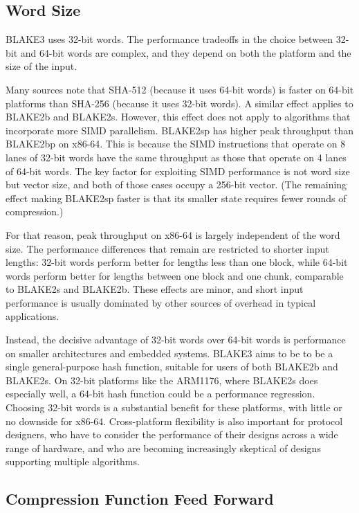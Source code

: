 \documentclass[11pt,notitlepage,a4paper]{article}
\begin{document}
\subsection{Word Size}\label{sec:wordsize}

BLAKE3 uses 32-bit words. The performance tradeoffs in the choice between
32-bit and 64-bit words are complex, and they depend on both the platform and
the size of the input.

Many sources note that SHA-512 (because it uses 64-bit words) is faster on
64-bit platforms than SHA-256 (because it uses 32-bit words). A similar effect
applies to BLAKE2b and BLAKE2s. However, this effect does not apply to
algorithms that incorporate more SIMD parallelism. BLAKE2sp has higher peak
throughput than BLAKE2bp on x86-64. This is because the SIMD instructions that
operate on 8 lanes of 32-bit words have the same throughput as those that
operate on 4 lanes of 64-bit words. The key factor for exploiting SIMD
performance is not word size but vector size, and both of those cases occupy a
256-bit vector. (The remaining effect making BLAKE2sp faster is that its
smaller state requires fewer rounds of compression.)

For that reason, peak throughput on x86-64 is largely independent of the word
size. The performance differences that remain are restricted to shorter input
lengths: 32-bit words perform better for lengths less than one block, while
64-bit words perform better for lengths between one block and one chunk,
comparable to BLAKE2s and BLAKE2b. These effects are minor, and short input
performance is usually dominated by other sources of overhead in typical
applications.

Instead, the decisive advantage of 32-bit words over 64-bit words is
performance on smaller architectures and embedded systems. BLAKE3 aims to be to
be a single general-purpose hash function, suitable for users of both BLAKE2b
and BLAKE2s. On 32-bit platforms like the ARM1176, where BLAKE2s does
especially well, a 64-bit hash function could be a performance regression.
Choosing 32-bit words is a substantial benefit for these platforms, with little
or no downside for x86-64. Cross-platform flexibility is also important for
protocol designers, who have to consider the performance of their designs
across a wide range of hardware, and who are becoming increasingly skeptical of
designs supporting multiple algorithms.\cite{WG}

\subsection{Compression Function Feed Forward}\label{sec:feedforward}
\end{document}
